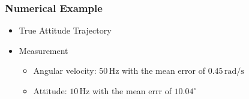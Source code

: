 \begin{frame}
\frametitle{Numerical Example}

\begin{itemize}
\item True Attitude Trajectory
    \begin{center}
\end{center}
\pause
\item Measurement
	\begin{itemize}
	\item Angular velocity: $50\,\mathrm{Hz}$ with the mean error of $0.45\,\mathrm{rad/s}$
	\item Attitude: $10\,\mathrm{Hz}$ with the mean errr of $10.04^\circ$
	\end{itemize}
\end{itemize}


\end{frame}


